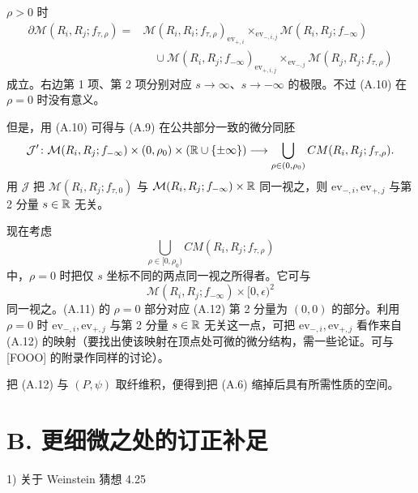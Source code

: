 $\rho>0$ 时
\begin{equation}
\begin{aligned}
  \partial\mathcal{M}(R_i,R_j;f_{\tau,\rho})
  ={}&\mathcal{M}(R_i,R_i;f_{\tau,\rho})_{\mathrm{ev}_{+,i}}
  \times_{\mathrm{ev}_{-,i,j}}\mathcal{M}(R_i,R_j;f_{-\infty})\\
  &\quad\cup\mathcal{M}(R_i,R_j;f_{-\infty})_{\mathrm{ev}_{+,i,j}}
  \times_{\mathrm{ev}_{-,j}}\mathcal{M}(R_j,R_j;f_{\tau,\rho})
\end{aligned}
\tag{A.10}
\end{equation}
成立。右边第 1 项、第 2 项分别对应 $s\to\infty$、$s\to-\infty$ 的极限。不过 (A.10) 在 $\rho=0$ 时没有意义。

但是，用 (A.10) 可得与 (A.9) 在公共部分一致的微分同胚
\[
  \mathcal{J}'\colon\mathcal{M}(R_i,R_j;f_{-\infty})\times(0,\rho_0)
  \times(\mathbb{R}\cup\{\pm\infty\})
  \longrightarrow\bigcup_{\rho\in(0,\rho_0)}CM(R_i,R_j;f_{\tau,\rho}).
\]
用 $\mathcal{J}$ 把 $\mathcal{M}(R_i,R_j;f_{\tau,0})$ 与 $\mathcal{M}(R_i,R_j;f_{-\infty})\times\mathbb{R}$ 同一视之，则 $\mathrm{ev}_{-,i},\mathrm{ev}_{+,j}$ 与第 2 分量 $s\in\mathbb{R}$ 无关。

现在考虑
\begin{equation}
  \bigcup_{\rho\in[0,\rho_0)}CM(R_i,R_j;f_{\tau,\rho}) \tag{A.11}
\end{equation}
中，$\rho=0$ 时把仅 $s$ 坐标不同的两点同一视之所得者。它可与
\begin{equation}
  \mathcal{M}(R_i,R_j;f_{-\infty})\times[0,\epsilon)^2 \tag{A.12}
\end{equation}
同一视之。(A.11) 的 $\rho=0$ 部分对应 (A.12) 第 2 分量为 $(0,0)$ 的部分。利用 $\rho=0$ 时 $\mathrm{ev}_{-,i},\mathrm{ev}_{+,j}$ 与第 2 分量 $s\in\mathbb{R}$ 无关这一点，可把 $\mathrm{ev}_{-,i},\mathrm{ev}_{+,j}$ 看作来自 (A.12) 的映射（要找出使该映射在顶点处可微的微分结构，需一些论证。可与 [FOOO] 的附录作同样的讨论）。

把 (A.12) 与 $(P,\psi)$ 取纤维积，便得到把 (A.6) 缩掉后具有所需性质的空间。


\section*{B. 更细微之处的订正补足}

1) 关于 Weinstein 猜想 4.25

